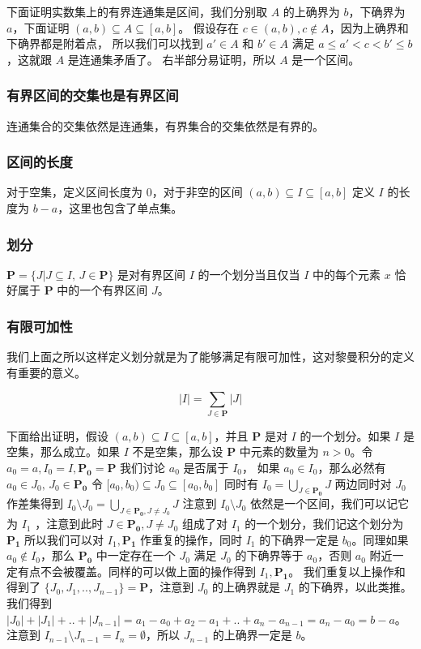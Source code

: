 下面证明实数集上的有界连通集是区间，我们分别取 $A$ 的上确界为 $b$，下确界为 $a$，下面证明 $(a,b) \subseteq A \subseteq [a,b]$。
假设存在 $c \in (a,b), c \notin A$，因为上确界和下确界都是附着点，
所以我们可以找到 $a' \in A $ 和 $b' \in A$ 满足 $a \le a' < c < b' \le b$，这就跟 $A$ 是连通集矛盾了。
右半部分易证明，所以 $A$ 是一个区间。

\subsubsection{有界区间的交集也是有界区间}

连通集合的交集依然是连通集，有界集合的交集依然是有界的。


\subsubsection{区间的长度}

对于空集，定义区间长度为 $0$，对于非空的区间 $(a,b) \subseteq I \subseteq [a,b]$ 定义 $I$ 的长度为 $b-a$，这里也包含了单点集。

\subsubsection{划分}

$\mathbf{P} = \{ J \vert J \subseteq I,\, J \in \mathbf{P} \}$ 是对有界区间 $I$ 的一个划分当且仅当 $I$ 中的每个元素 $x$ 恰好属于 $\mathbf{P}$ 中的一个有界区间 $J$。

\subsubsection{有限可加性}

我们上面之所以这样定义划分就是为了能够满足有限可加性，这对黎曼积分的定义有重要的意义。

\[
    \lvert I \rvert = \sum_{J \in \mathbf{P}} \lvert J \rvert
\]

下面给出证明，假设 $(a,b) \subseteq I \subseteq [a,b] $，并且 $\mathbf{P}$ 是对 $I$ 的一个划分。如果 $I$ 是空集，那么成立。如果 $I$ 不是空集，那么设 $\mathbf{P}$ 中元素的数量为 $n > 0$。令 $a_0=a, I_0 = I, \mathbf{P_0} = \mathbf{P}$ 我们讨论 $a_0$ 是否属于 $I_0$，
如果 $a_0 \in I_0$，那么必然有 $a_0 \in J_0 ,\, J_0 \in \mathbf{P_0}$ 令 $[a_0, b_0) \subseteq J_0 \subseteq [a_0, b_0]$ 同时有 $I_0 = \bigcup_{J \in \mathbf{P_0}} J $ 两边同时对 $J_0$ 作差集得到 $I_0 \setminus J_0 = \bigcup_{J \in \mathbf{P_0}, J \ne J_0}J$ 
注意到 $I_0 \setminus J_0$ 依然是一个区间，我们可以记它为 $I_1$ ，注意到此时 $J \in \mathbf{P_0}, J \ne J_0$ 组成了对 $I_1$ 的一个划分，我们记这个划分为 $\mathbf{P_1}$ 所以我们可以对 $I_1, \mathbf{P_1}$ 作重复的操作，同时 $I_1$ 的下确界一定是 $b_0$。同理如果 $a_0 \notin I_0$，那么 $\mathbf{P_0}$ 中一定存在一个 $J_0$ 满足 $J_0$ 的下确界等于 $a_0$，否则 $a_0$ 附近一定有点不会被覆盖。同样的可以做上面的操作得到 $I_1, \mathbf{P_1}$。
我们重复以上操作和得到了 $\{ J_0, J_1, .., J_{n-1} \} = \mathbf{P}$，注意到 $J_0$ 的上确界就是 $J_1$ 的下确界，以此类推。我们得到 $\lvert J_0 \rvert + \lvert J_1 \rvert  + .. + \lvert J_{n-1} \rvert = a_1 -a_0 + a_2 - a_1 + .. + a_n - a_{n-1} = a_n - a_0 = b - a$。
注意到 $I_{n-1} \setminus J_{n-1} = I_n = \emptyset$，所以 $J_{n-1}$ 的上确界一定是 $b$。

